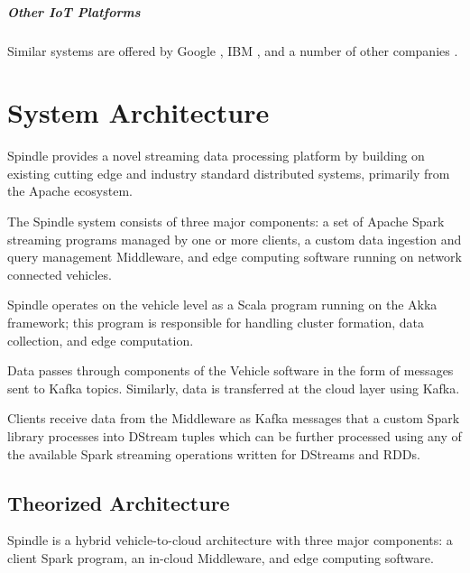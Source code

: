 \documentclass{thesis}
\begin{document}
        \paragraph{Other IoT Platforms}
            Similar systems are offered by Google \cite{google:iot}, IBM \cite{ibm:iot}, and a number of other companies
            \cite{forbes:iot}.

\chapter{System Architecture}
    Spindle provides a novel streaming data processing platform by building on
    existing cutting edge and industry standard distributed systems, primarily
    from the Apache ecosystem. 

    The Spindle system consists of three major components: a set of Apache Spark %
    streaming programs managed by one or more clients, a custom data ingestion and
    query management Middleware, and edge computing software running on network
    connected vehicles.
    
    Spindle operates on the vehicle level as a Scala
    \cite{scala} program running on the Akka \cite{akka} framework; this program
    is responsible for handling cluster formation, data collection, and edge
    computation.

    Data passes through components of the Vehicle software in the form of 
    messages sent to Kafka \cite{kafka} topics. Similarly, data is transferred
    at the cloud layer using Kafka.

    Clients receive data from the Middleware as Kafka messages that a custom Spark \cite{spark}
    library processes into DStream tuples which can be further processed using any of the available
    Spark streaming operations written for DStreams and RDDs.

\section{Theorized Architecture}
    Spindle is a hybrid vehicle-to-cloud architecture with three major components: a client Spark program,
    an in-cloud Middleware, and edge computing software.
\end{document}
